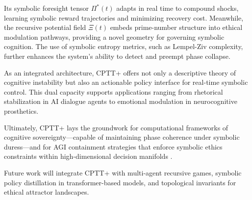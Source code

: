 \documentclass[12pt]{article}
\begin{document}
Its symbolic foresight tensor $\Pi^*(t)$ adapts in real time to compound shocks, learning symbolic reward trajectories and minimizing recovery cost. Meanwhile, the recursive potential field $\Xi(t)$ embeds prime-number structure into ethical modulation pathways, providing a novel geometry for governing symbolic cognition. The use of symbolic entropy metrics, such as Lempel-Ziv complexity, further enhances the system’s ability to detect and preempt phase collapse.

As an integrated architecture, CPTT+ offers not only a descriptive theory of cognitive instability but also an actionable policy interface for real-time symbolic control. This dual capacity supports applications ranging from rhetorical stabilization in AI dialogue agents to emotional modulation in neurocognitive prosthetics.

Ultimately, CPTT+ lays the groundwork for computational frameworks of cognitive sovereignty—capable of maintaining phase coherence under symbolic duress—and for AGI containment strategies that enforce symbolic ethics constraints within high-dimensional decision manifolds \cite{bostrom2014superintelligence, gabriel2020artificial, allen2005artificial}.

\medskip

Future work will integrate CPTT+ with multi-agent recursive games, symbolic policy distillation in transformer-based models, and topological invariants for ethical attractor landscapes.








\nocite{*}


\end{document}
